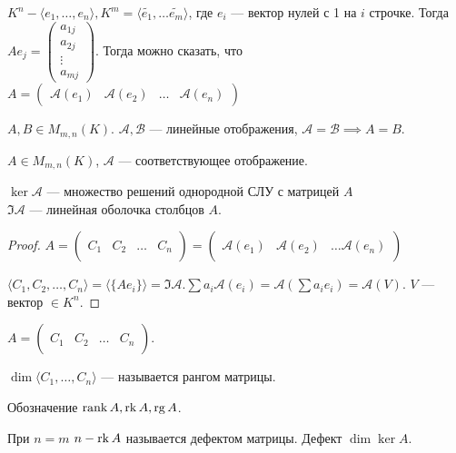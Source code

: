 $K^n - \langle e_1, \ldots, e_n \rangle, K^m = \langle \widetilde{e_1}, \ldots \widetilde{e_m} \rangle$, где $e_i$ --- вектор нулей с 1 на  $i$ строчке. Тогда 
$A e_j = \begin{pmatrix} a_{1j} \\ a_{2j} \\ \vdots \\ a_{mj} \end{pmatrix}$. 
Тогда можно сказать, что $A = \left(\begin{array}{c|c|c|c} \mathcal{A}(e_1) & \mathcal{A}(e_2) & \ldots & \mathcal{A}(e_n) \end{array} \right)$ 

\begin{consequence}
    $A, B \in M_{m, n}(K)$.  $\mathcal{A}, \mathcal{B}$ --- линейные отображения,  $\mathcal{A} = \mathcal{B} \implies A = B$.
\end{consequence}
\begin{statement}
    $A \in M_{m, n}(K)$,  $\mathcal{A}$ --- соответствующее отображение.

    $\ker \mathcal{A}$ --- множество решений однородной СЛУ с матрицей  $A$\\
    $\Im \mathcal{A}$ --- линейная оболочка столбцов $A$.
\end{statement}
\begin{proof}
    $A = \left( \begin{array}{c|c|c|c} & &  \\ C_1 & C_2 & \ldots & C_n \\ & & \end{array} \right) = \left(\begin{array}{c|c|c} & &  \\ \mathcal{A}(e_1) & \mathcal{A}(e_2) & \ldots \mathcal{A}(e_n) \\ & & \end{array} \right)$

    $\langle C_1, C_2, \ldots, C_n \rangle = \langle \{A e_i \} \rangle = \Im \mathcal{A}. \sum a_i \mathcal{A}(e_i) = \mathcal{A}(\sum a_i e_i) = \mathcal{A}(V)$. $V$ --- вектор  $\in K^n$.
\end{proof}
\begin{definition}
    $A = \left( \begin{array}{c|c|c|c} & &  \\ C_1 & C_2 & \ldots & C_n \\ & & \end{array} \right)$.

    $\dim \langle C_1, \ldots, C_n \rangle$ --- называется рангом матрицы.

    Обозначение $\operatorname{rank} A, \operatorname{rk} A, \operatorname{rg} A$.
    
    При $n=m$  $n-\operatorname{rk} A$ называется  дефектом матрицы. Дефект $\dim \ker A$.
\end{definition}
